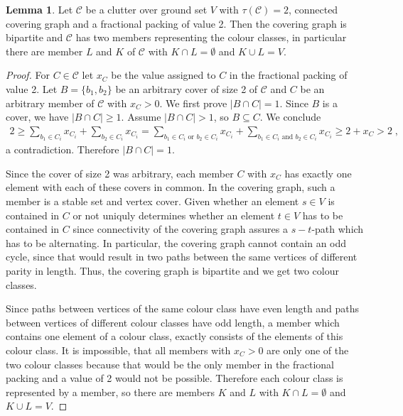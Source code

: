 \documentclass[a4paper, 12pt, twoside=false]{scrbook}
\theoremstyle{definition}
\newtheorem{lemma}{Lemma}
\begin{document}
   \begin{lemma}
       Let $\mathcal{C}$ be a clutter over ground set $V$ with $\tau(\mathcal{C})=2$, connected covering graph and a fractional packing of value 2.
       Then the covering graph is bipartite and $\mathcal{C}$ has two members representing the colour classes, in particular there are member $L$ and $K$ of $\mathcal{C}$ with $K \cap L = \emptyset$ and $K \cup L = V$.
   \end{lemma}

   \begin{proof}
       For $C \in \mathcal{C}$ let $x_C$ be the value assigned to $C$ in the fractional packing of value 2.
       Let $B=\{b_1,b_2\}$ be an arbitrary cover of size 2 of $\mathcal{C}$ and $C$ be an arbitrary member of $\mathcal{C}$ with $x_{C} > 0$.
       We first prove $|B\cap C| = 1$.
       Since $B$ is a cover, we have $|B\cap C| \geq 1$.
       Assume $|B \cap C| > 1$, so $B \subseteq C$.
       We conclude
       \begin{align*}
           2 \geq \sum_{b_1 \in C_i} x_{C_i} + \sum_{b_2 \in C_i} x_{C_i} = \sum_{b_1 \in C_i \text{ or } b_2 \in C_i} x_{C_i} + \sum_{b_1 \in C_i \text{ and } b_2 \in C_i} x_{C_i} \geq 2 + x_C > 2 \;,
       \end{align*}
       a contradiction. Therefore $|B\cap C| = 1$.

       Since the cover of size 2 was arbitrary, each member $C$ with $x_C$ has exactly one element with each of these covers in common.
       In the covering graph, such a member is a stable set and vertex cover.
       Given whether an element $s \in V$ is contained in $C$ or not uniquly determines whether an element $t \in V$ has to be contained in $C$ since connectivity of the covering graph assures a $s-t$-path which has to be alternating.
       In particular, the covering graph cannot contain an odd cycle, since that would result in two paths between the same vertices of different parity in length. Thus, the covering graph is bipartite and we get two colour classes.

       Since paths between vertices of the same colour class have even length and paths between vertices of different colour classes have odd length, a member which contains one element of a colour class, exactly consists of the elements of this colour class.
       It is impossible, that all members with $x_C > 0$ are only one of the two colour classes because that would be the only member in the fractional packing and a value of 2 would not be possible.
       Therefore each colour class is represented by a member, so there are members $K$ and $L$ with $K \cap L = \emptyset$ and $K \cup L = V$.

   \end{proof}
\end{document}
